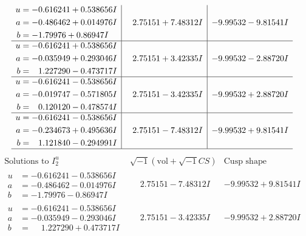 \documentclass[1p]{elsarticle_modified}
\theoremstyle{definition}
\newcommand{\I}{\sqrt{-1}}
\begin{document}
$$\begin{array}{c|c|c}
\begin{aligned}
u &= -0.616241 + 0.538656 I \\
a &= -0.486462 + 0.014976 I \\
b &= -1.79976 + 0.86947 I\end{aligned}
 & \phantom{-}2.75151 + 7.48312 I & -9.99532 - 9.81541 I \\ \hline\begin{aligned}
u &= -0.616241 + 0.538656 I \\
a &= -0.035949 + 0.293046 I \\
b &= \phantom{-}1.227290 - 0.473717 I\end{aligned}
 & \phantom{-}2.75151 + 3.42335 I & -9.99532 - 2.88720 I \\ \hline\begin{aligned}
u &= -0.616241 - 0.538656 I \\
a &= -0.019747 - 0.571805 I \\
b &= \phantom{-}0.120120 - 0.478574 I\end{aligned}
 & \phantom{-}2.75151 - 3.42335 I & -9.99532 + 2.88720 I \\ \hline\begin{aligned}
u &= -0.616241 - 0.538656 I \\
a &= -0.234673 + 0.495636 I \\
b &= \phantom{-}1.121840 - 0.294991 I\end{aligned}
 & \phantom{-}2.75151 - 7.48312 I & -9.99532 + 9.81541 I\\
 \hline 
 \end{array}$$\newpage$$\begin{array}{c|c|c}  
\text{Solutions to }I^u_{2}& \I (\text{vol} + \sqrt{-1}CS) & \text{Cusp shape}\\
 \hline 
\begin{aligned}
u &= -0.616241 - 0.538656 I \\
a &= -0.486462 - 0.014976 I \\
b &= -1.79976 - 0.86947 I\end{aligned}
 & \phantom{-}2.75151 - 7.48312 I & -9.99532 + 9.81541 I \\ \hline\begin{aligned}
u &= -0.616241 - 0.538656 I \\
a &= -0.035949 - 0.293046 I \\
b &= \phantom{-}1.227290 + 0.473717 I\end{aligned}
 & \phantom{-}2.75151 - 3.42335 I & -9.99532 + 2.88720 I \\ \hline\begin{aligned}

\end{aligned}
\end{array}$$
\end{document}
